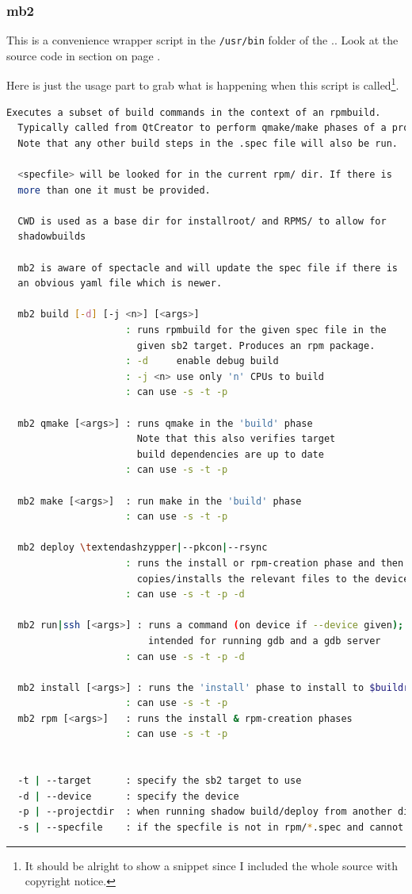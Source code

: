 \subsubsection{mb2}\label{subsubsec:mb2}
%
This is a convenience wrapper script in the \verb,/usr/bin, folder of the .. Look at the source code in section  on page \pageref{subsec:appendix:mb2}.

Here is just the usage part to grab what is happening when this script is called\footnote{It should be alright to show a snippet since I included the whole source with copyright notice.}.
%
\begin{lstlisting}[language=bash]
  Executes a subset of build commands in the context of an rpmbuild.
  Typically called from QtCreator to perform qmake/make phases of a project.
  Note that any other build steps in the .spec file will also be run.

  <specfile> will be looked for in the current rpm/ dir. If there is
  more than one it must be provided.

  CWD is used as a base dir for installroot/ and RPMS/ to allow for
  shadowbuilds

  mb2 is aware of spectacle and will update the spec file if there is
  an obvious yaml file which is newer.

  mb2 build [-d] [-j <n>] [<args>]
                     : runs rpmbuild for the given spec file in the
                       given sb2 target. Produces an rpm package.
                     : -d     enable debug build
                     : -j <n> use only 'n' CPUs to build
                     : can use -s -t -p

  mb2 qmake [<args>] : runs qmake in the 'build' phase
                       Note that this also verifies target
                       build dependencies are up to date
                     : can use -s -t -p  

  mb2 make [<args>]  : run make in the 'build' phase
                     : can use -s -t -p  

  mb2 deploy \textendashzypper|--pkcon|--rsync
                     : runs the install or rpm-creation phase and then
                       copies/installs the relevant files to the device
                     : can use -s -t -p -d

  mb2 run|ssh [<args>] : runs a command (on device if --device given);
                         intended for running gdb and a gdb server
                     : can use -s -t -p -d

  mb2 install [<args>] : runs the 'install' phase to install to $buildroot
                     : can use -s -t -p
  mb2 rpm [<args>]   : runs the install & rpm-creation phases
                     : can use -s -t -p


  -t | --target      : specify the sb2 target to use
  -d | --device      : specify the device
  -p | --projectdir  : when running shadow build/deploy from another dir
  -s | --specfile    : if the specfile is not in rpm/*.spec and cannot be found using -p
\end{lstlisting}
%
%

